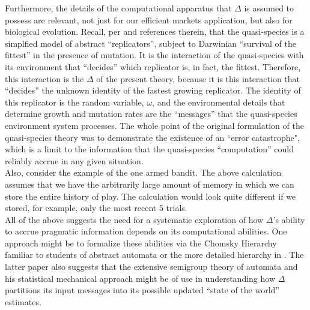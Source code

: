 \documentclass[11pt]{article}
\begin{document}
Furthermore, the details of the computational apparatus that $\Delta$ is assumed to possess are relevant, not just for our efficient markets application, but also for 
biological evolution.  Recall, per \cite{Weinberger02} and references therein, that the quasi-species is a simplfied model of abstract ``replicators'', subject to Darwinian ``survival of the fittest'' in the presence of mutation.   It is the interaction of the quasi-species with its environment that ``decides'' which replicator is, in fact, the fittest.  Therefore, this interaction is the $\Delta$ of the present theory, because it is this interaction that ``decides'' the unknown identity of the fastest growing replicator.  The identity of this replicator is the random variable, $\omega$, and the environmental
details that determine growth and mutation rates are the ``messages'' that the quasi-species environment system processes.  The whole point of the original formulation
of the quasi-species theory \cite{QS} was to demonstrate the existence of an ``error catastrophe", which is a limit to the information that the quasi-species ``computation'' could reliably accrue in any given situation.\\

Also, consider the example of the one armed bandit.  The above calculation assumes that we have the arbitrarily large amount of memory in which we can  store the entire history of play.  The calculation would look quite different if we stored, for example, only the most recent 5 trials.\\

All of the above suggests the need for a systematic exploration of how $\Delta$'s ability to accrue pragmatic information depends on its computational abilities.  One approach might be to formalize these abilities via the
Chomsky Hierarchy familiar to students of abstract automata \cite{Sipser} or the more detailed hierarchy in \cite{Crutchfield}.  The latter paper also suggests that the extensive semigroup theory of automata and his statistical mechanical approach might be 
of use in understanding how $\Delta$ partitions its input messages into its possible updated ``state of the world'' estimates.\\
\end{document}
